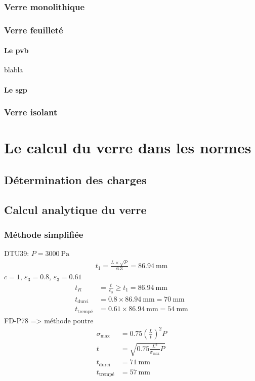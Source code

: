 \documentclass[11pt,titlepage]{article}
\begin{document}
\subsubsection{Verre monolithique}
\subsubsection{Verre feuilleté}
\paragraph{Le \acrshort{pvb}}
blabla
\paragraph{Le \acrshort{sgp}}
\subsubsection{Verre isolant}
\newpage
\section{Le calcul du verre dans les normes}
\subsection{Détermination des charges}
\subsection{Calcul analytique du verre}
\subsubsection{Méthode simplifiée}
DTU39: $P = \qty{3000}{\pascal}$
\begin{align}
    t_1 = \frac{L \times \sqrt{P}}{6.3} = \qty{86.94}{\milli\meter}
\end{align}
$c=1$, $\varepsilon_3 = 0.8$, $\varepsilon_3 = 0.61$
\begin{align}
    t_R &= \frac{t}{\varepsilon_3} \geq t_1 =  \qty{86.94}{\milli\meter}\\ 
    t_{\text{durci}} &= 0.8\times \qty{86.94}{\milli\meter}= \qty{70}{\milli\meter}\\
    t_{\text{trempé}} &= 0.61 \times \qty{86.94}{\milli\meter} = \qty{54}{\milli\meter}
\end{align}
FD-P78 => méthode poutre
\begin{align}
    \sigma_{\text{max}} &= 0.75\left (\frac{L}{t}\right)^2 P \\
    t &= \sqrt{0.75\frac{L^2}{\sigma_{\text{max}}}P}\\
     t_{\text{durci}} &= \qty{71}{\milli\meter}\\
    t_{\text{trempé}} &= \qty{57}{\milli\meter}
\end{align}
\end{document}
